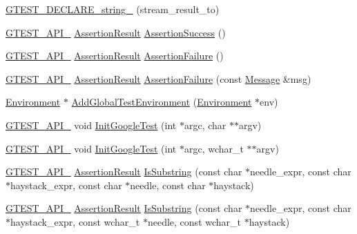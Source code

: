 \begin{DoxyCompactItemize}
\item 
\hyperlink{namespacetesting_ad4d1ea63037fc21018dbe997cb0041d1}{G\+T\+E\+S\+T\+\_\+\+D\+E\+C\+L\+A\+R\+E\+\_\+string\+\_\+} (stream\+\_\+result\+\_\+to)
\item 
\hyperlink{gtest-port_8h_aa73be6f0ba4a7456180a94904ce17790}{G\+T\+E\+S\+T\+\_\+\+A\+P\+I\+\_\+} \hyperlink{classtesting_1_1AssertionResult}{Assertion\+Result} \hyperlink{namespacetesting_ac1d0baedb17286c5c6c87bd1a45da8ac}{Assertion\+Success} ()
\item 
\hyperlink{gtest-port_8h_aa73be6f0ba4a7456180a94904ce17790}{G\+T\+E\+S\+T\+\_\+\+A\+P\+I\+\_\+} \hyperlink{classtesting_1_1AssertionResult}{Assertion\+Result} \hyperlink{namespacetesting_a75cb789614cb1c28c34627a4a3c053df}{Assertion\+Failure} ()
\item 
\hyperlink{gtest-port_8h_aa73be6f0ba4a7456180a94904ce17790}{G\+T\+E\+S\+T\+\_\+\+A\+P\+I\+\_\+} \hyperlink{classtesting_1_1AssertionResult}{Assertion\+Result} \hyperlink{namespacetesting_a6bdf82adf159dcda822d75746937ffa9}{Assertion\+Failure} (const \hyperlink{classtesting_1_1Message}{Message} \&msg)
\item 
\hyperlink{classtesting_1_1Environment}{Environment} $\ast$ \hyperlink{namespacetesting_a460d7b998622e332392c1e00be3a60d5}{Add\+Global\+Test\+Environment} (\hyperlink{classtesting_1_1Environment}{Environment} $\ast$env)
\item 
\hyperlink{gtest-port_8h_aa73be6f0ba4a7456180a94904ce17790}{G\+T\+E\+S\+T\+\_\+\+A\+P\+I\+\_\+} void \hyperlink{namespacetesting_afd726ae08c9bd16dc52f78c822d9946b}{Init\+Google\+Test} (int $\ast$argc, char $\ast$$\ast$argv)
\item 
\hyperlink{gtest-port_8h_aa73be6f0ba4a7456180a94904ce17790}{G\+T\+E\+S\+T\+\_\+\+A\+P\+I\+\_\+} void \hyperlink{namespacetesting_ae5a88709a4a7529e30c83242156556b3}{Init\+Google\+Test} (int $\ast$argc, wchar\+\_\+t $\ast$$\ast$argv)
\item 
\hyperlink{gtest-port_8h_aa73be6f0ba4a7456180a94904ce17790}{G\+T\+E\+S\+T\+\_\+\+A\+P\+I\+\_\+} \hyperlink{classtesting_1_1AssertionResult}{Assertion\+Result} \hyperlink{namespacetesting_a390c4f66fe7e9098117eb77e5fffa4ad}{Is\+Substring} (const char $\ast$needle\+\_\+expr, const char $\ast$haystack\+\_\+expr, const char $\ast$needle, const char $\ast$haystack)
\item 
\hyperlink{gtest-port_8h_aa73be6f0ba4a7456180a94904ce17790}{G\+T\+E\+S\+T\+\_\+\+A\+P\+I\+\_\+} \hyperlink{classtesting_1_1AssertionResult}{Assertion\+Result} \hyperlink{namespacetesting_aa1c82529c7591d2a9fd016de45dd9113}{Is\+Substring} (const char $\ast$needle\+\_\+expr, const char $\ast$haystack\+\_\+expr, const wchar\+\_\+t $\ast$needle, const wchar\+\_\+t $\ast$haystack)

\end{DoxyCompactItemize}
